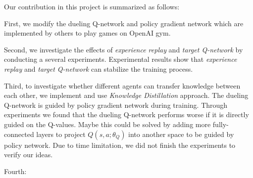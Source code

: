 
Our contribution in this project is summarized as follows:

First, we modify the dueling Q-network and policy gradient network which are implemented by others to play games on OpenAI gym.

Second, we investigate the effects of \textit{experience replay} and \textit{target Q-network} by conducting a several experiments. Experimental results show that \textit{experience replay} and \textit{target Q-network} can stabilize the training process.

Third, to investigate whether different agents can transfer knowledge between each other, we implement and use \textit{Knowledge Distillation } approach. The dueling Q-network is guided by policy gradient network during training. Through experiments we found that the dueling Q-network performs worse if it is directly guided on the Q-values. 
%
Maybe this could be solved by adding more fully-connected layers to project $Q(s,a;\theta_{Q})$ into another space to be guided by policy network.
%
Due to time limitation, we did not finish the experiments to verify our ideas.

Fourth:
